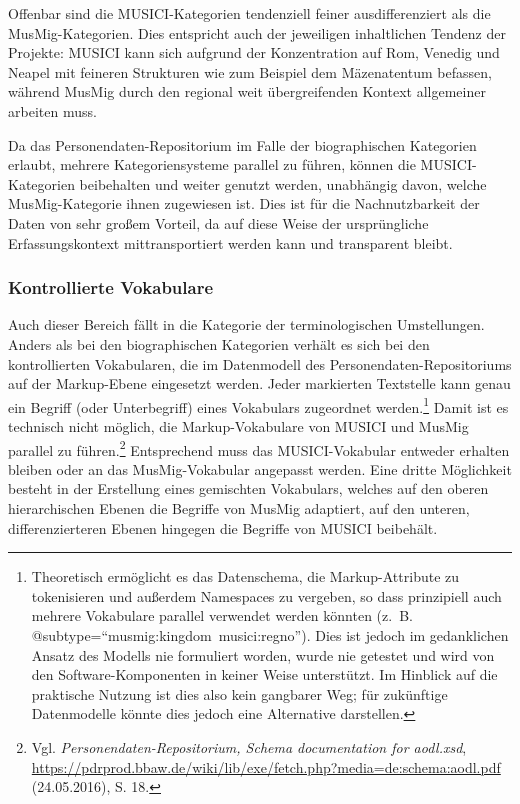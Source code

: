 \documentclass[a4paper,
fontsize=11pt,
oneside,
numbers=noperiodatend,
parskip=half-,
bibliography=totoc,
final
]{scrartcl}
\begin{document}
Offenbar sind die MUSICI-Kategorien tendenziell feiner ausdifferenziert
als die MusMig-Ka\-te\-go\-rien. Dies entspricht auch der jeweiligen
inhaltlichen Tendenz der Projekte: MUSICI kann sich aufgrund der
Konzentration auf Rom, Venedig und Neapel mit feineren Strukturen wie
zum Beispiel dem Mäzenatentum befassen, während MusMig durch den
regional weit übergreifenden Kontext allgemeiner arbeiten muss.

Da das Personendaten-Repositorium im Falle der biographischen Kategorien
erlaubt, mehrere Kategoriensysteme parallel zu führen, können die
MUSICI-Kategorien beibehalten und weiter genutzt werden, unabhängig
davon, welche MusMig-Kategorie ihnen zugewiesen ist. Dies ist für die
Nachnutzbarkeit der Daten von sehr großem Vorteil, da auf diese Weise
der ursprüngliche Erfassungskontext mittransportiert werden kann und
transparent bleibt.

\subsubsection*{Kontrollierte Vokabulare}\label{kontrollierte-vokabulare}

Auch dieser Bereich fällt in die Kategorie der terminologischen
Umstellungen. Anders als bei den biographischen Kategorien verhält es
sich bei den kontrollierten Vokabularen, die im Datenmodell des
Personendaten-Repositoriums auf der Markup-Ebene eingesetzt werden.
Jeder markierten Textstelle kann genau ein Begriff (oder Unterbegriff)
eines Vokabulars zugeordnet werden.\footnote{Theoretisch ermöglicht es
  das Datenschema, die Markup-Attribute zu tokenisieren und außerdem
  Namespaces zu vergeben, so dass prinzipiell auch mehrere Vokabulare
  parallel verwendet werden könnten (z.~B.
  @subtype=\enquote{musmig:kingdom~musici:regno}). Dies ist jedoch im
  gedanklichen Ansatz des Modells nie formuliert worden, wurde nie
  getestet und wird von den Software-Komponenten in keiner Weise
  unterstützt. Im Hinblick auf die praktische Nutzung ist dies also kein
  gangbarer Weg; für zukünftige Datenmodelle könnte dies jedoch eine
  Alternative darstellen.} Damit ist es technisch nicht möglich, die
Markup-Vokabulare von MUSICI und MusMig parallel zu führen.\footnote{Vgl.
  \emph{Personendaten-Repositorium, Schema documentation for aodl.xsd},
  \url{https://pdrprod.bbaw.de/wiki/lib/exe/fetch.php?media=de:schema:aodl.pdf}
  (24.05.2016), S. 18.} Entsprechend muss das MUSICI-Vokabular entweder
erhalten bleiben oder an das MusMig-Vokabular angepasst werden. Eine
dritte Möglichkeit besteht in der Erstellung eines gemischten
Vokabulars, welches auf den oberen hierarchischen Ebenen die Begriffe
von MusMig adaptiert, auf den unteren, differenzierteren Ebenen hingegen
die Begriffe von MUSICI beibehält.
\end{document}
